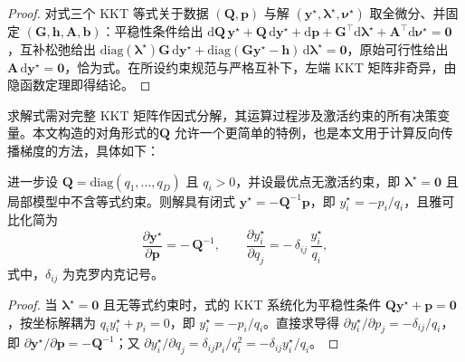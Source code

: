 \begin{proof}
对式三个 KKT 等式关于数据 $(\mathbf{Q},\mathbf{p})$ 与解 $(\mathbf{y}^{\star},\boldsymbol{\lambda}^{\star},\boldsymbol{\nu}^{\star})$ 取全微分、并固定 $(\mathbf{G},\mathbf{h},\mathbf{A},\mathbf{b})$：平稳性条件给出 $\mathrm{d}\mathbf{Q}\,\mathbf{y}^{\star}+\mathbf{Q}\,\mathrm{d}\mathbf{y}^{\star}+\mathrm{d}\mathbf{p}+\mathbf{G}^{\top}\mathrm{d}\boldsymbol{\lambda}^{\star}+\mathbf{A}^{\top}\mathrm{d}\boldsymbol{\nu}^{\star}=\mathbf{0}$，互补松弛给出 $\mathrm{diag}(\boldsymbol{\lambda}^{\star})\mathbf{G}\,\mathrm{d}\mathbf{y}^{\star}+\mathrm{diag}(\mathbf{G}\mathbf{y}^{\star}-\mathbf{h})\,\mathrm{d}\boldsymbol{\lambda}^{\star}=\mathbf{0}$，原始可行性给出 $\mathbf{A}\,\mathrm{d}\mathbf{y}^{\star}=\mathbf{0}$，恰为式。在所设约束规范与严格互补下，左端 KKT 矩阵非奇异\citep{fiaccoIntroductionSensitivityStability1983}，由隐函数定理即得结论。
\end{proof}

求解式需对完整 KKT 矩阵作因式分解，其运算过程涉及激活约束的所有决策变量。本文构造的对角形式的$\mathbf{Q}$ 允许一个更简单的特例，也是本文用于计算反向传播梯度的方法，具体如下：

\begin{Theorem}[对角特例]\label{prop.cohact.diag}
进一步设 $\mathbf{Q}=\mathrm{diag}(q_1,\dots,q_D)$ 且 $q_i>0$，并设最优点无激活约束，即 $\boldsymbol{\lambda}^{\star}=\mathbf{0}$ 且局部模型中不含等式约束。则解具有闭式 $\mathbf{y}^{\star}=-\mathbf{Q}^{-1}\mathbf{p}$，即 $y_i^{\star}=-p_i/q_i$，且雅可比化简为
\begin{equation}
\frac{\partial\mathbf{y}^{\star}}{\partial\mathbf{p}}=-\,\mathbf{Q}^{-1},
\qquad
\frac{\partial y_i^{\star}}{\partial q_j}=-\,\delta_{ij}\,\frac{y_i^{\star}}{q_i},
\label{eq.cohact.grad}
\end{equation}
式中，$\delta_{ij}$ 为克罗内克记号。
\end{Theorem}

\begin{proof}
当 $\boldsymbol{\lambda}^{\star}=\mathbf{0}$ 且无等式约束时，式的 KKT 系统化为平稳性条件 $\mathbf{Q}\mathbf{y}^{\star}+\mathbf{p}=\mathbf{0}$，按坐标解耦为 $q_i y_i^{\star}+p_i=0$，即 $y_i^{\star}=-p_i/q_i$。直接求导得 $\partial y_i^{\star}/\partial p_j=-\delta_{ij}/q_i$，即 $\partial\mathbf{y}^{\star}/\partial\mathbf{p}=-\mathbf{Q}^{-1}$；又 $\partial y_i^{\star}/\partial q_j=\delta_{ij}p_i/q_i^2=-\delta_{ij}y_i^{\star}/q_i$。
\end{proof}

